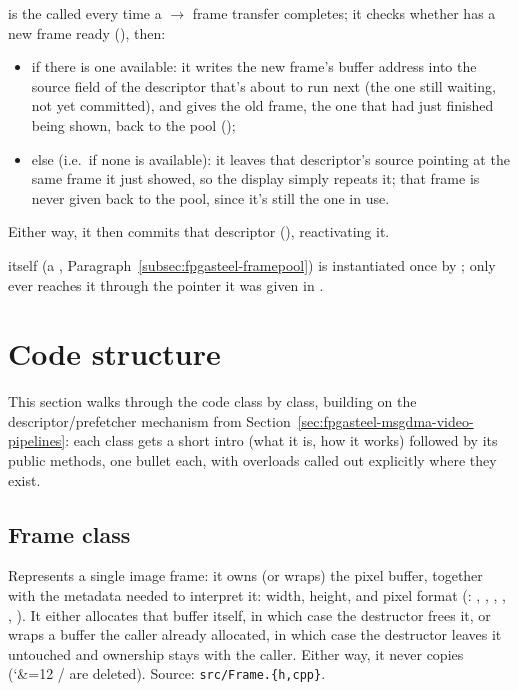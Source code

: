  is the  called every time a $\rightarrow$  frame transfer completes; it checks whether  has a new frame ready (), then:
\begin{itemize}
    \item if there is one available: it writes the new frame's buffer address into the source field of the descriptor that's about to run next (the one still waiting, not yet committed), and gives the old frame, the one that had just finished being shown, back to the pool ();
    \item else (i.e.\ if none is available): it leaves that descriptor's source pointing at the same frame it just showed, so the display simply repeats it; that frame is never given back to the pool, since it's still the one in use.
\end{itemize}
Either way, it then commits that descriptor (), reactivating it.

 itself (a , Paragraph~\ref{subsec:fpgasteel-framepool}) is instantiated once by ;  only ever reaches it through the pointer it was given in .

\section{Code structure}
\label{sec:fpgasteel-code-structure}

This section walks through the code class by class, building on the descriptor/prefetcher mechanism from Section~\ref{sec:fpgasteel-msgdma-video-pipelines}: each class gets a short intro (what it is, how it works) followed by its public methods, one bullet each, with overloads called out explicitly where they exist.

\subsection{Frame class}
\label{subsec:fpgasteel-frame-class}

Represents a single image frame: it owns (or wraps) the pixel buffer, together with the metadata needed to interpret it: width, height, and pixel format (: , , , , , ). It either allocates that buffer itself, in which case the destructor frees it, or wraps a buffer the caller already allocated, in which case the destructor leaves it untouched and ownership stays with the caller. Either way, it never copies ({\catcode`\&=12 }/ are deleted). Source: \lstinline[style=inlineFsRepo]!src/Frame.{h,cpp}!.

